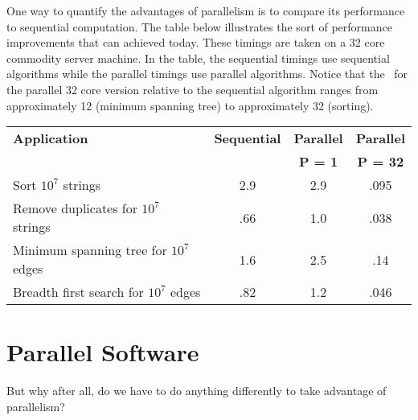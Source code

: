 \begin{cluster}
\label{grp:ex:intro::intro::example-runs}

\begin{example}
\label{ex:intro::intro::example-runs}
One way to quantify the advantages of parallelism is to compare
its performance to sequential computation.
The table below illustrates the sort of performance improvements
that can achieved today.  
These timings are taken on a 32 core commodity server machine.  In the
table, the sequential timings use sequential algorithms while the
parallel timings use parallel algorithms.  Notice that
the~ for the parallel 32 core version relative to the
sequential algorithm ranges from approximately 12 (minimum spanning
tree) to approximately 32 (sorting).

  \begin{tabular}{l  c c c}
    \toprule
    \textbf{Application} & \textbf{Sequential} & \textbf{Parallel} &
    \textbf{Parallel}
\\
     & & \textbf{P = 1} & \textbf{P = 32}
\\
    \midrule
    Sort $10^7$ strings &        2.9 &  2.9 &  .095\\
    Remove duplicates for $10^7$ strings &      .66 &  1.0 & .038\\
    Minimum spanning tree for $10^7$ edges    &    1.6 & 2.5  & .14\\
    Breadth first search for $10^7$ edges  &   .82  & 1.2 &  .046\\
    \bottomrule
  \end{tabular}

\end{example}
\end{cluster}


\section{Parallel Software}
\label{sec:introduction::parallelism::parallel-software}

\begin{cluster}
\label{grp:tch:introduction::parallelism::anything}

\begin{teachask}
\label{tch:introduction::parallelism::anything}
But why after all, do we have to do anything differently to take
advantage of parallelism?  

\end{teachask}
\end{cluster}

